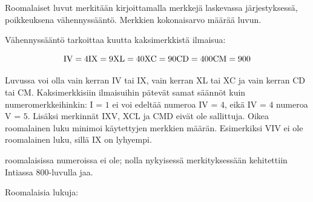 Roomalaiset luvut merkitään kirjoittamalla merkkejä laskevassa järjestyksessä, poikkeuksena vähennyssääntö. Merkkien kokonaisarvo määrää luvun.

Vähennyssääntö tarkoittaa kuutta kaksimerkkistä ilmaisua:

\begin{equation*} %
	\rm IV=4
	IX=9
	XL=40
	XC=90
	CD=400
	CM=900
\end{equation*}

Luvussa voi olla vain kerran IV tai IX, vain kerran XL tai XC ja vain kerran CD tai CM.
Kaksimerkkisiin ilmaisuihin pätevät samat säännöt kuin numeromerkkeihinkin: I = $1$ ei voi edeltää numeroa IV = $4$, eikä IV = $4$ numeroa V = $5$. Lisäksi merkinnät IXV, XCL ja CMD eivät ole sallittuja. Oikea roomalainen luku minimoi käytettyjen merkkien määrän. Esimerkiksi VIV ei ole roomalainen luku, sillä IX on lyhyempi.

 roomalaisissa numeroissa ei ole; nolla nykyisessä merkityksessään kehitettiin Intiassa 800-luvulla jaa.

\begin{esimerkki}
	Roomalaisia lukuja:
\end{esimerkki}

